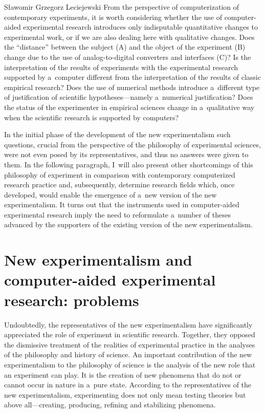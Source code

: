 \begin{artengenv}{Sławomir Grzegorz Leciejewski}
From the perspective of computerization of contemporary experiments, it is worth considering whether the use of computer-aided experimental research introduces only indisputable quantitative changes to experimental work, or if we are also dealing here with qualitative changes. Does the ``distance'' between the subject (A) and the object of the experiment (B) change due to the use of analog-to-digital converters and interfaces (C)? Is the interpretation of the results of experiments with the experimental research supported by a~computer different from the interpretation of the results of classic empirical research? Does the use of numerical methods introduce a~different type of justification of scientific hypotheses---namely a~numerical justification? Does the status of the experimenter in empirical sciences change in a~qualitative way when the scientific research is supported by computers?



In the initial phase of the development of the new experimentalism such questions, crucial from the perspective of the philosophy of experimental sciences, were not even posed by its representatives, and thus no answers were given to them. In the following paragraph, I~will also present other shortcomings of this philosophy of experiment in comparison with contemporary computerized research practice and, subsequently, determine research fields which, once developed, would enable the emergence of a~new version of the new experimentalism. It turns out that the instruments used in computer-aided experimental research imply the need to reformulate a~number of theses advanced by the supporters of the existing version of the new experimentalism.



\section*{New experimentalism and computer-aided experimental research: problems}

Undoubtedly, the representatives of the new experimentalism have significantly appreciated the role of experiment in scientific research. Together, they opposed the dismissive treatment of the realities of experimental practice in the analyses of the philosophy and history of science. An important contribution of the new experimentalism to the philosophy of science is the analysis of the new role that an experiment can play. It is the creation of new phenomena that do not or cannot occur in nature in a~pure state. According to the representatives of the new experimentalism, experimenting does not only mean testing theories but above all---creating, producing, refining and stabilizing phenomena.




\end{artengenv}

